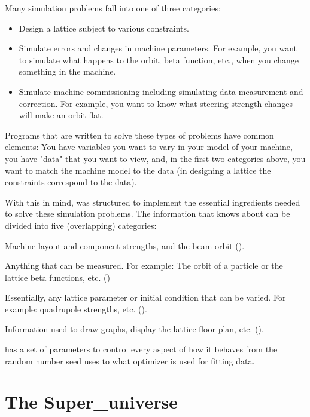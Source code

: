 Many simulation problems fall into one of three categories: 
\begin{itemize}
\item 
Design a lattice subject to various constraints.
\item
Simulate errors and changes in machine parameters. For example, you want to
simulate what happens to the orbit, beta function, etc., when you change
something in the machine. 
\item 
Simulate machine commissioning including simulating data measurement and
correction. For example, you want to know what steering strength changes will
make an orbit flat.
\end{itemize}
Programs that are written to solve these types of problems have common
elements: You have variables you want to vary in your model of your
machine, you have "data" that you want to view, and, in the first two
categories above, you want to match the machine model to the data (in
designing a lattice the constraints correspond to the data).

With this in mind, \tao was structured to implement the essential
ingredients needed to solve these simulation problems.  
The information that \tao knows about can be divided into five
(overlapping) categories:
\begin{description}
  \item[Lattice] \Newline   
Machine layout and component strengths, and the beam orbit ().
  \item[Data] \Newline
Anything that can be measured.
For example: The orbit of a particle or the lattice beta 
functions, etc. ()
  \item[Variables] \Newline
Essentially, any lattice parameter or initial condition that can be varied.
For example: quadrupole strengths, etc. ().
  \item[Plotting]  \Newline
Information used to draw graphs, display the lattice 
floor plan, etc. ().
  \item[Global Parameters] \Newline
 \tao has a set of parameters to control every aspect of how it behaves from
the random number seed \tao uses to what optimizer is used for fitting data.
\end{description}

\section{The Super\_universe}
\label{s:super.uni}

